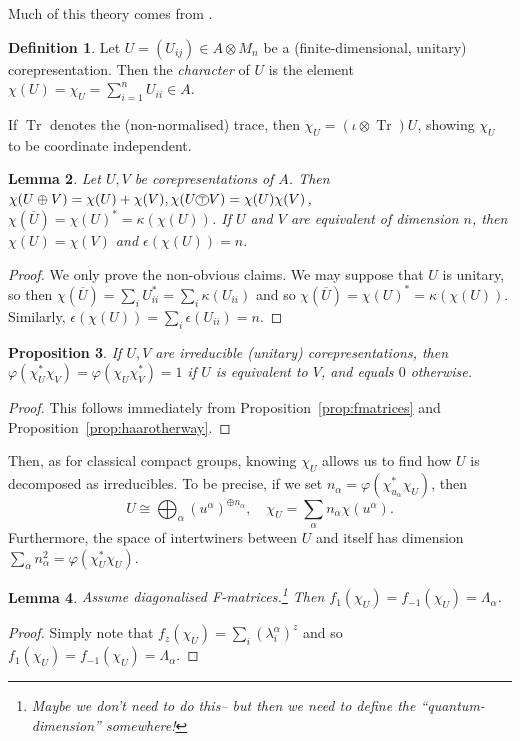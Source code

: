 \documentclass[twoside,a4paper,12pt]{article}
\theoremstyle{plain}
\newtheorem{proposition}{Proposition}[section]
\newtheorem{lemma}[proposition]{Lemma}
\theoremstyle{definition}
\newtheorem{definition}[proposition]{Definition}
\newcommand{\cotp}{\xymatrix{*+<.7ex>[o][F-]{\scriptstyle\top}}}
\newcommand{\tr}{\operatorname{Tr}}
\begin{document}
Much of this theory comes from \cite[Section~5]{woro3}.

\begin{definition}
Let $U = (U_{ij})\in A\otimes M_n$ be a (finite-dimensional, unitary)
corepresentation.  Then the \emph{character} of $U$ is the element
$\chi(U) = \chi_U = \sum_{i=1}^n U_{ii} \in A$.
\end{definition}

If $\tr$ denotes the (non-normalised) trace, then
$\chi_U = (\iota\otimes\tr)U$, showing $\chi_U$ to be coordinate independent.

\begin{lemma}
Let $U,V$ be corepresentations of $A$.  Then $\chi(U\oplus V) = \chi(U) +
\chi(V), \chi(U\cotp V) = \chi(U)\chi(V)$, $\chi(\overline{U}) = \chi(U)^* =
\kappa(\chi(U))$.
If $U$ and $V$ are equivalent of dimension $n$, then $\chi(U)=\chi(V)$
and $\epsilon(\chi(U)) = n$.
\end{lemma}
\begin{proof}
We only prove the non-obvious claims.  We may suppose that $U$ is unitary, so
then $\chi(\overline U) = \sum_i U_{ii}^* = \sum_i \kappa(U_{ii})$ and
so $\chi(\overline U) = \chi(U)^* = \kappa(\chi(U))$.  Similarly,
$\epsilon(\chi(U)) = \sum_i \epsilon(U_{ii}) = n$.
\end{proof}

\begin{proposition}\label{prop:char_are_on}
If $U,V$ are irreducible (unitary) corepresentations, then
$\varphi(\chi_U^*\chi_V) = \varphi(\chi_U\chi_V^*) = 1$ if $U$ is equivalent
to $V$, and equals $0$ otherwise.
\end{proposition}
\begin{proof}
This follows immediately from Proposition~\ref{prop:fmatrices}
and Proposition~\ref{prop:haarotherway}.
\end{proof}

Then, as for classical compact groups, knowing $\chi_U$ allows us to find
how $U$ is decomposed as irreducibles.  To be precise, if we set
$n_\alpha = \varphi(\chi_{u_\alpha}^* \chi_U)$, then
\[ U \cong \bigoplus_\alpha (u^\alpha)^{\oplus n_\alpha}, \quad
\chi_U = \sum_\alpha n_\alpha \chi(u^\alpha). \]
Furthermore, the space of intertwiners between $U$ and itself has
dimension $\sum_\alpha n_\alpha^2 = \varphi(\chi_U^*\chi_U)$.

\begin{lemma}
Assume diagonalised F-matrices.\footnote{Maybe we don't need to do this--
but then we need to define the ``quantum-dimension'' somewhere!}
Then $f_1(\chi_U) = f_{-1}(\chi_U) = \Lambda_\alpha$.
\end{lemma}
\begin{proof}
Simply note that $f_z(\chi_U) = \sum_i (\lambda^\alpha_i)^z$ and so
$f_1(\chi_U) = f_{-1}(\chi_U) = \Lambda_\alpha$.
\end{proof}
\end{document}
